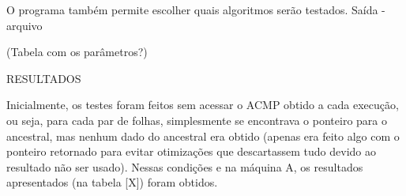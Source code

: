 O programa também permite escolher quais algoritmos serão testados.
Saída - arquivo

(Tabela com os parâmetros?)


RESULTADOS

Inicialmente, os testes foram feitos sem acessar o ACMP obtido a cada execução, ou seja, para cada par de folhas, simplesmente se encontrava o ponteiro para o ancestral, mas nenhum dado do ancestral era obtido (apenas era feito algo com o ponteiro retornado para evitar otimizações que descartassem tudo devido ao resultado não ser usado).
Nessas condições e na máquina A, os resultados apresentados (na tabela [X]) foram obtidos.


